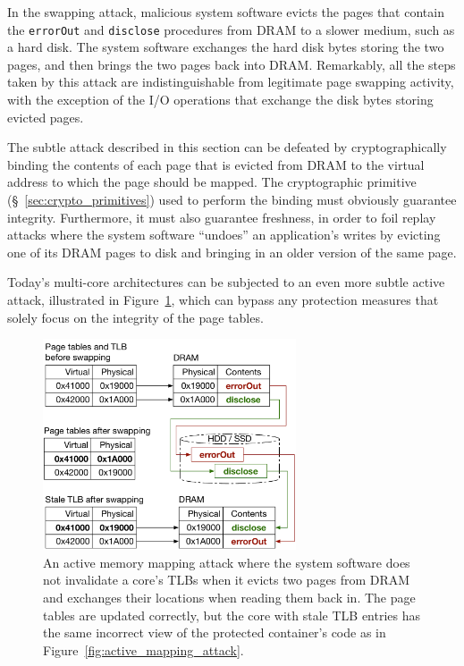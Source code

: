 In the swapping attack, malicious system software evicts the pages that contain
the \texttt{errorOut} and \texttt{disclose} procedures from DRAM to a slower
medium, such as a hard disk. The system software exchanges the hard disk
bytes storing the two pages, and then brings the two pages back into DRAM.
Remarkably, all the steps taken by this attack are indistinguishable from
legitimate page swapping activity, with the exception of the I/O operations
that exchange the disk bytes storing evicted pages.

The subtle attack described in this section can be defeated by
cryptographically binding the contents of each page that is evicted from DRAM
to the virtual address to which the page should be mapped. The cryptographic
primitive (\S~\ref{sec:crypto_primitives}) used to perform the binding must
obviously guarantee integrity. Furthermore, it must also guarantee freshness, in
order to foil replay attacks where the system software ``undoes'' an
application's writes by evicting one of its DRAM pages to disk and bringing in
an older version of the same page.


\label{sec:tlb_mapping_attacks}

Today's multi-core architectures can be subjected to an even more subtle active
attack, illustrated in Figure~\ref{fig:tlb_mapping_attack}, which can bypass
any protection measures that solely focus on the integrity of the page tables.

\begin{figure}[hbt]
  \centering
  \includegraphics[width=75mm]{figures/tlb_mapping_attack.pdf}
  \caption{
    An active memory mapping attack where the system software does not
    invalidate a core's TLBs when it evicts two pages from DRAM and exchanges
    their locations when reading them back in. The page tables are updated
    correctly, but the core with stale TLB entries has the same incorrect view
    of the protected container's code as in
    Figure~\ref{fig:active_mapping_attack}.
  }
  \label{fig:tlb_mapping_attack}
\end{figure}

